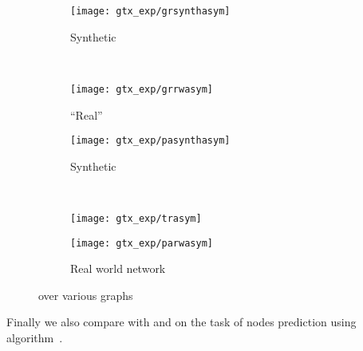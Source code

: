 \begin{figure}[tbh]
	\centering
	\begin{subfigure}[b]{0.47\textwidth}
		\texttt{[image: gtx\_exp/grsynthasym]}
		\caption{Synthetic \grid{} \label{fig:gtx_xp_grsynthasym}}
	\end{subfigure}~
	\begin{subfigure}[b]{0.47\textwidth}
		\texttt{[image: gtx\_exp/grrwasym]}
		\caption{\enquote{Real} \grid{} }\label{fig:gtx_xp_grrwasym}
	\end{subfigure}
	\begin{subfigure}[b]{0.47\textwidth}
		\texttt{[image: gtx\_exp/pasynthasym]}
		\caption{Synthetic \lpa{} }\label{fig:gtx_xp_pasynthasym}
	\end{subfigure}~
	\begin{subfigure}[b]{0.47\textwidth}
		\texttt{[image: gtx\_exp/trasym]}
		\caption{\triangle{} }\label{fig:gtx_xp_trasym}
	\end{subfigure}
	\begin{subfigure}[b]{0.47\textwidth}
		\texttt{[image: gtx\_exp/parwasym]}
		\caption{Real world network }\label{fig:gtx_xp_parwasym}
	\end{subfigure}
	\caption{\asym{} over various graphs}\label{fig:gtx_xp_asym}
\end{figure}

Finally we also compare \gtx{} with \bfs{} and \rst{} on
the task of nodes prediction using \shz{} algorithm~\autocite{Vitale2012}.

